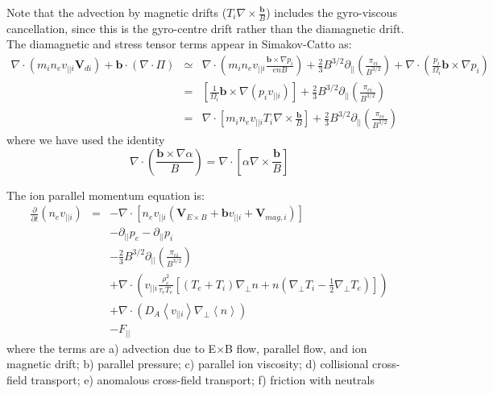 \documentclass[12pt,a4paper]{article}
\begin{document}
Note that the advection by magnetic drifts ($T_i\nabla\times\frac{\mathbf{b}}{B}$) includes the gyro-viscous cancellation, since this is the gyro-centre drift rather than the diamagnetic drift. The diamagnetic and stress tensor terms appear in Simakov-Catto as:
\begin{eqnarray}
\nabla\cdot\left(m_in_ev_{||i}\mathbf{V}_{di}\right) + \mathbf{b}\cdot\left(\nabla\cdot\Pi\right) &\simeq& \nabla\cdot\left(m_in_ev_{||i}\frac{\mathbf{b}\times\nabla p_i}{enB}\right) + \frac{2}{3}B^{3/2}\partial_{||}\left(\frac{\pi_{ci}}{B^{3/2}}\right) + \nabla\cdot\left(\frac{p_i}{\Omega_i}\mathbf{b}\times\nabla p_i\right) \nonumber \\
&=& \left[\frac{1}{\Omega_i}\mathbf{b}\times\nabla\left( p_i v_{||i}\right)\right] + \frac{2}{3}B^{3/2}\partial_{||}\left(\frac{\pi_{ci}}{B^{3/2}}\right) \nonumber \\
&=& \nabla\cdot\left[m_in_ev_{||i}T_i\nabla\times\frac{\mathbf{b}}{B}\right] + \frac{2}{3}B^{3/2}\partial_{||}\left(\frac{\pi_{ci}}{B^{3/2}}\right) \label{eq:vicancellation}
\end{eqnarray}
where we have used the identity
\begin{equation}
\nabla\cdot\left(\frac{\mathbf{b}\times\nabla\alpha}{B}\right) = \nabla\cdot\left[\alpha\nabla\times\frac{\mathbf{b}}{B}\right]
\end{equation}

The ion parallel momentum equation is:
\begin{subequations}
\begin{eqnarray}
%
%
  \frac{\partial}{\partial t}\left(n_ev_{||i}\right) &=& -\nabla\cdot\left[n_ev_{||i}\left(\mathbf{V}_{E\times B} + \mathbf{b}v_{||i} + \mathbf{V}_{mag,i}\right)\right] \\
  && - \partial_{||}p_e - \partial_{||}p_i \\
  && - \frac{2}{3}B^{3/2}\partial_{||}\left(\frac{\pi_{ci}}{B^{3/2}}\right) \\
  && + \nabla\cdot\left(v_{||i}\frac{\rho_e^2}{\tau_eT_e}\left[  \left(T_e+T_i\right)\nabla_\perp n  + n\left(\nabla_\perp T_i - \frac{1}{2}\nabla_\perp T_e\right)\right]\right) \\
  && + \nabla\cdot \left(D_A\left<v_{||i}\right>\nabla_\perp \left<n\right>\right) \\
  && - F_{||}
\end{eqnarray}
\end{subequations}
where the terms are a) advection due to E$\times$B flow, parallel flow, and ion magnetic drift; b) parallel pressure; c) parallel ion viscosity; d) collisional cross-field transport; e) anomalous cross-field transport; f) friction with neutrals
\end{document}
